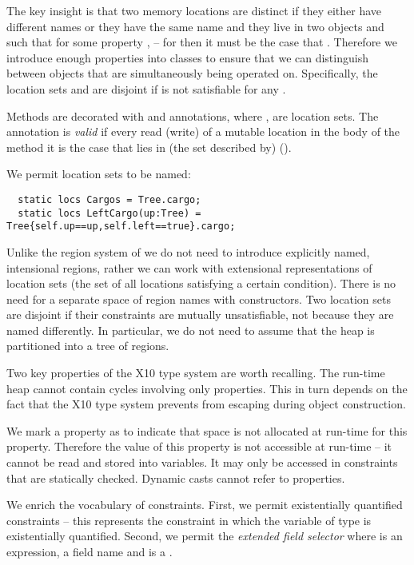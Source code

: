 The key insight is that two memory locations are distinct if they
either have different names or they have the same name  and
they live in two objects  and  such that for some
property ,  -- for then it must be the case
that . Therefore we introduce enough properties into
classes to ensure that we can distinguish between objects that are
simultaneously being operated on. Specifically, the location sets
 and  are disjoint if
 is not satisfiable for any .

Methods are decorated with  and 
annotations, where , are location sets. The annotation
is {\em valid} if every read (write) of a mutable location  in the
body of the method it is the case that  lies in (the set
described by)  ().

We permit location sets to be named:
\begin{lstlisting}
  static locs Cargos = Tree.cargo;
  static locs LeftCargo(up:Tree) = Tree{self.up==up,self.left==true}.cargo;
\end{lstlisting}

Unlike the region system of \cite{DPJ} we do not need to introduce
explicitly named, intensional regions, rather we can work with
extensional representations of location sets (the set of all locations
satisfying a certain condition).  There is no need for a separate
space of region names with constructors. Two location sets are
disjoint if their constraints are mutually unsatisfiable, not because
they are named differently. In particular, we do not need to assume
that the heap is partitioned into a tree of regions.

Two key properties of the X10 type system are worth recalling. The run-time
heap cannot contain cycles involving only properties. This in turn
depends on the fact that the X10 type system prevents  from
escaping during object construction\cite{X10-object-initialization}.

We mark a property as  to indicate that space is not
allocated at run-time for this property. Therefore the value of this
property is not accessible at run-time -- it cannot be read and stored
into variables. It may only be accessed in constraints that are
statically checked. Dynamic casts cannot refer to 
properties.

We enrich the vocabulary of constraints. First, we permit
existentially quantified constraints  -- this represents
the constraint  in which the variable  of type
 is existentially quantified. Second, we permit the {\em
  extended field selector}  where  is an
expression,  a field name and  is a .

